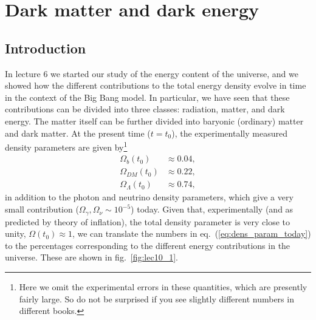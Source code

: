\chapter{Dark matter and dark energy}

\section{Introduction}

In lecture 6 we started our study of the energy content of the universe, and we showed how the different contributions to the total energy density evolve in time in the context of the Big Bang model. In particular, we have seen that these contributions can be divided into three classes: radiation, matter, and dark energy. The matter itself can be further divided into baryonic (ordinary) matter and dark matter. At the present time ($t=t_0$), the experimentally measured density parameters are given by\footnote{Here we omit the experimental errors in these quantities, which are presently fairly large. So do not be surprised if you see slightly different numbers in different books.}
\begin{equation} \label{eq:dens_param_today}
\begin{split}
\Omega_{b}(t_0)&\approx 0.04,\\
\Omega_{DM}(t_0)&\approx 0.22,\\
\Omega_{\Lambda}(t_0)&\approx 0.74,
\end{split}
\end{equation}
in addition to the photon and neutrino density parameters, which give a very small contribution ($\Omega_{\gamma},\Omega_{\nu}\sim10^{-5}$) today. Given that, experimentally (and as predicted by theory of inflation), the total density parameter is very close to unity, $\Omega(t_0)\approx 1$, we can translate the numbers in eq.\ (\ref{eq:dens_param_today}) to the percentages corresponding to the different energy contributions in the universe. These are shown in fig.\ \ref{fig:lec10_1}.

